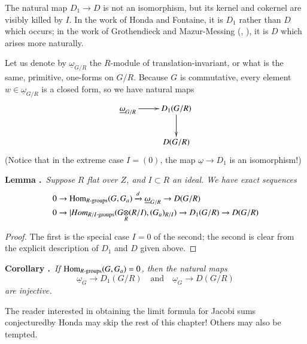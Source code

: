 The natural map $D_{1}\to D$ is not an isomorphism, but its kernel and cokernel are visibly killed by $I$. In the work of Honda and Fontaine, it is $D_{1}$ rather than $D$ which occurs; in the work of Grothendieck and Mazur-Messing (\cite{art6-key17}, \cite{art6-key35}), it is $D$ which arises more naturally.

Let us denote by $\underline{\omega}_{G/R}$ the $R$-module of translation-invariant, or what is the same, primitive, one-forms on $G/R$. Because $G$ is commutative, every element $w\in \underline{\omega}_{G/R}$ is a closed form, so we have natural maps
\[
\xymatrix{
\underline{\omega}_{G/R}\ar[r] & D_{1}(G/R)\ar[d]\\
                              & D(G/R)
}
\]
(Notice that in the extreme case $I=(0)$, the map $\underline{\omega}\to D_{1}$ is an isomorphism!)

\medskip
\noindent
{\bf Lemma .\label{art6-lem5.1.7}}~{\em Suppose $R$ flat over $Z$, and $I\subset R$ an ideal. We have exact sequences}
\begin{align*}
& 0\to \Hom_{R\text{-groups}}(G,G_{a})\xrightarrow{d}\underline{\omega}_{G/R}\to D(G/R)\\
& 0\to |Hom_{R/I\text{-groups}}(\foprod{G}{(R/I)}{R},(G_{a})_{R/I})\to D_{1}(G/R)\to D(G/R)
\end{align*}

\begin{proof}
The first is the special case $I=0$ of the second; the second is clear from the explicit description of $D_{1}$ and $D$ given above.
\end{proof}

\medskip
\noindent
{\bf Corollary .\label{art6-coro5.1.8}}~{\em If $\operatorname{Hom}_{R\text{-groups}}(G,G_{a})=0$, then the natural maps}
$$
\underline{\omega}_{G}\to D_{1}(G/R)\quad\text{and}\quad \underline{\omega}_{G}\to D(G/R)
$$
{\em are injective.}
\smallskip

The reader interested in obtaining the limit formula for Jacobi sums conjectured\pageoriginale by Honda may skip the rest of this chapter! Others may also be tempted.

\setcounter{section}{5}
\setcounter{subsection}{1}
